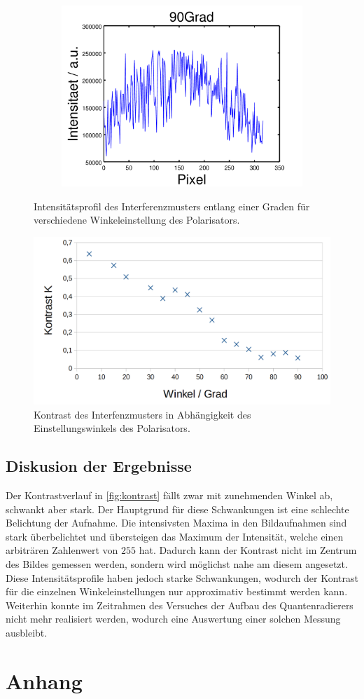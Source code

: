 \documentclass[numbers=noenddot,a4paper,notitlepage,twoside,BCOR15mm]{scrartcl}
\begin{document}
\begin{figure}
\begin{subfigure}{.49\textwidth}
		\end{subfigure}
		\begin{subfigure}{.49\textwidth}
			\centering
			\includegraphics[width=0.75\linewidth]{pics/90grad.png}
		\end{subfigure}
		\caption{Intensitätsprofil des Interferenzmusters entlang einer Graden für verschiedene Winkeleinstellung des Polarisators.}
		\label{fig:test}
	\end{figure}
	
	\begin{figure}
		\centering
		\includegraphics[width=0.8\columnwidth]{pics/Kontrast.png}
		\caption{Kontrast des Interfenzmusters in Abhängigkeit des Einstellungswinkels des Polarisators.}
		\label{fig:kontrast}
	\end{figure}
	\newpage
	\subsection{Diskusion der Ergebnisse}
	
	Der Kontrastverlauf in \autoref{fig:kontrast} fällt zwar mit zunehmenden Winkel ab, schwankt aber stark. Der Hauptgrund für diese Schwankungen ist eine schlechte Belichtung der Aufnahme. Die intensivsten Maxima in den Bildaufnahmen sind stark überbelichtet und übersteigen das Maximum der Intensität, welche einen arbiträren Zahlenwert von $255$ hat. Dadurch kann der Kontrast nicht im Zentrum des Bildes gemessen werden, sondern wird möglichst nahe am diesem angesetzt. Diese Intensitätsprofile haben jedoch starke Schwankungen, wodurch der Kontrast für die einzelnen Winkeleinstellungen nur approximativ bestimmt werden kann.\\
	Weiterhin konnte im Zeitrahmen des Versuches der Aufbau des Quantenradierers nicht mehr realisiert werden, wodurch eine Auswertung einer solchen Messung ausbleibt.
	
	\newpage
	\section{Anhang}
	
	
	
	
\end{document}
